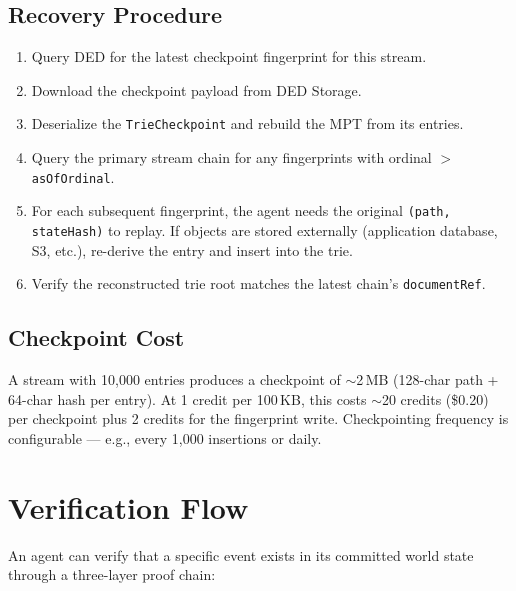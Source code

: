 \documentclass[11pt,a4paper]{article}
\begin{document}
\subsection{Recovery Procedure}

\begin{enumerate}
  \item Query DED for the latest checkpoint fingerprint for this stream.
  \item Download the checkpoint payload from DED Storage.
  \item Deserialize the \texttt{TrieCheckpoint} and rebuild the MPT from its entries.
  \item Query the primary stream chain for any fingerprints with ordinal $>$
    \texttt{asOfOrdinal}.
  \item For each subsequent fingerprint, the agent needs the original
    \texttt{(path, stateHash)} to replay. If objects are stored externally (application
    database, S3, etc.), re-derive the entry and insert into the trie.
  \item Verify the reconstructed trie root matches the latest chain's \texttt{documentRef}.
\end{enumerate}

\subsection{Checkpoint Cost}

A stream with 10,000 entries produces a checkpoint of $\sim$2\,MB (128-char path + 64-char
hash per entry). At 1 credit per 100\,KB, this costs $\sim$20 credits (\$0.20) per
checkpoint plus 2 credits for the fingerprint write. Checkpointing frequency is
configurable --- e.g., every 1,000 insertions or daily.


\section{Verification Flow}

An agent can verify that a specific event exists in its committed world state through a
three-layer proof chain:
\end{document}
